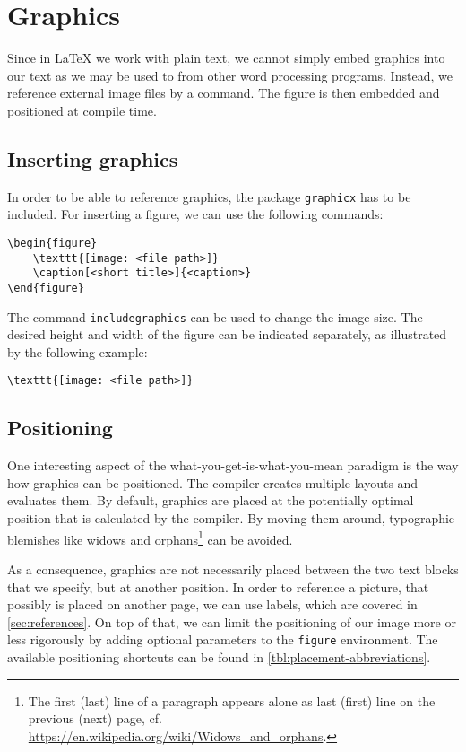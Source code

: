 \chapter{Graphics}
\label{sec:graphics}

Since in \LaTeX{} we work with plain text, we cannot simply embed graphics into our text as we may be used to from other word processing programs. 
Instead, we reference external image files by a command. The figure is then embedded and positioned at compile time.

\section{Inserting graphics}
\label{sec:display-graphics}
In order to be able to reference graphics, the package \texttt{graphicx} has to be included. For inserting a figure, we can use the following commands:
	
\begin{verbatim}
\begin{figure}
	\texttt{[image: <file path>]}
	\caption[<short title>]{<caption>}
\end{figure}
\end{verbatim}

\noindent The command \texttt{includegraphics} can be used to change the image size. The desired height and width of the figure can be indicated separately, as illustrated by the following example:

\begin{verbatim}
\texttt{[image: <file path>]}
\end{verbatim}

\section{Positioning}
\label{sec:graphics-placement}
One interesting aspect of the  what-you-get-is-what-you-mean paradigm is the way how graphics can be positioned. 
The compiler creates multiple layouts and evaluates them. 
By default, graphics are placed at the potentially optimal position that is calculated by the compiler.
By moving them around, typographic blemishes like widows and orphans\footnote{The first (last) line of a paragraph appears alone as last (first) line on the previous (next) page, cf. \url{https://en.wikipedia.org/wiki/Widows_and_orphans}.} can be avoided. 

As a consequence, graphics are not necessarily placed between the two text blocks that we specify, but at another position. 
In order to reference a picture, that possibly is placed on another page, we can use labels, which are covered in \cref{sec:references}. 
On top of that, we can limit the positioning of our image more or less rigorously by adding optional parameters to the \texttt{figure} environment. The available positioning shortcuts can be found in \cref{tbl:placement-abbreviations}.


